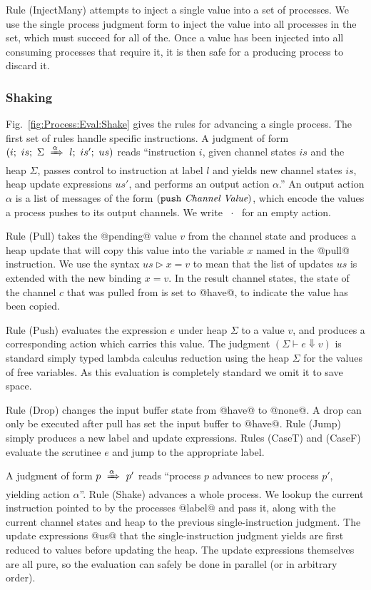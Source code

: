Rule (InjectMany) attempts to inject a single value into a set of processes. We use the single process judgment form to inject the value into all processes in the set, which must succeed for all of the. Once a value has been injected into all consuming processes that require it, it is then safe for a producing process to discard it.


\subsubsection{Shaking}
Fig.~\ref{fig:Process:Eval:Shake} gives the rules for advancing a single process. The first set of rules handle specific instructions. A judgment of form $(i;~is;~\Sigma~\xRightarrow{\alpha}~l;~is';~us)$ reads ``instruction $i$, given channel states $is$ and the heap $\Sigma$, passes control to instruction at label $l$ and yields new channel states $is$, heap update expressions $us'$, and performs an output action $\alpha$.'' An output action $\alpha$ is a list of messages of the form $(\texttt{push}~\textit{Channel}~\textit{Value})$, which encode the values a process pushes to its output channels. We write ~$\cdot$~ for an empty action. 

\eject{}
Rule (Pull) takes the @pending@ value $v$ from the channel state and produces a heap update that will copy this value into the variable $x$ named in the @pull@ instruction. We use the syntax $us \rhd x=v$ to mean that the list of updates $us$ is extended with the new binding $x=v$. In the result channel states, the state of the channel $c$ that was pulled from is set to @have@, to indicate the value has been copied.

Rule (Push) evaluates the expression $e$ under heap $\Sigma$ to a value $v$, and produces a corresponding action which carries this value. The judgment $(\Sigma \vdash e \Downarrow v)$ is standard simply typed lambda calculus reduction using the heap $\Sigma$ for the values of free variables. As this evaluation is completely standard we omit it to save space.

Rule (Drop) changes the input buffer state from @have@ to @none@. A drop can only be executed after pull has set the input buffer to @have@. Rule (Jump) simply produces a new label and update expressions. Rules (CaseT) and (CaseF) evaluate the scrutinee $e$ and jump to the appropriate label.

A judgment of form $p~\xRightarrow{\alpha}~p'$ reads ``process $p$ advances to new process $p'$, yielding action $\alpha$''. Rule (Shake) advances a whole process. We lookup the current instruction pointed to by the processes @label@ and pass it, along with the current channel states and heap to the previous single-instruction judgment. The update expressions @us@ that the single-instruction judgment yields are first reduced to values before updating the heap. The update expressions themselves are all pure, so the evaluation can safely be done in parallel (or in arbitrary order).


